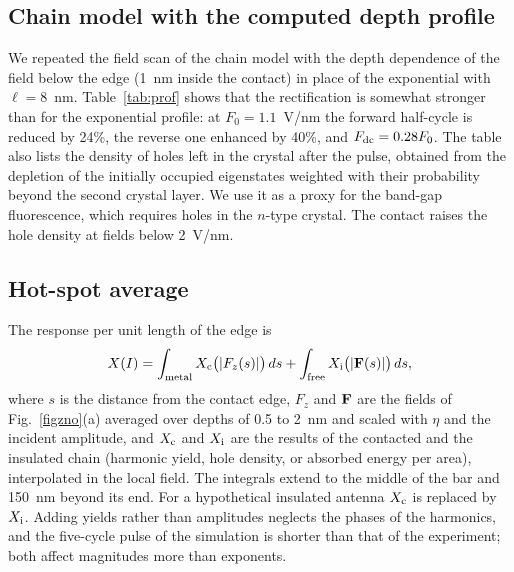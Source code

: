 \subsection{Chain model with the computed depth profile}
We repeated the field scan of the chain model with the depth dependence of the field below the edge
(1~nm inside the contact) in place of the exponential with $\ell=8$~nm. Table~\ref{tab:prof} shows
that the rectification is somewhat stronger than for the exponential profile: at $F_0=1.1$~V/nm the
forward half-cycle is reduced by 24\%, the reverse one enhanced by 40\%, and
$F_{\rm dc}=0.28F_0$. The table also lists the density of holes left in the crystal after the
pulse, obtained from the depletion of the initially occupied eigenstates weighted with their
probability beyond the second crystal layer. We use it as a proxy for the band-gap fluorescence,
which requires holes in the $n$-type crystal. The contact raises the hole density at fields below 2~V/nm.

\begin{table}[h]
\caption{Chain model with the depth profile of the near field below the edge of the bar. Other
parameters as in Table~\ref{tab:field}.}
\label{tab:prof}

\end{table}

\subsection{Hot-spot average}
The response per unit length of the edge is
\begin{equation}
X(I)=\int_{\rm metal}X_{\rm c}\big(|F_z(s)|\big)\,ds+\int_{\rm free}X_{\rm i}\big(|{\bf F}(s)|\big)\,ds ,
\end{equation}
where $s$ is the distance from the contact edge, $F_z$ and ${\bf F}$ are the fields of
Fig.~\ref{figzno}(a) averaged over depths of 0.5 to 2~nm and scaled with $\eta$ and the incident
amplitude, and $X_{\rm c}$ and $X_{\rm i}$ are the results of the contacted and the insulated chain
(harmonic yield, hole density, or absorbed energy per area), interpolated in the local field. The
integrals extend to the middle of the bar and 150~nm beyond its end. For a hypothetical insulated
antenna $X_{\rm c}$ is replaced by $X_{\rm i}$. Adding yields rather than amplitudes neglects the
phases of the harmonics, and the five-cycle pulse of the simulation is shorter than that of the
experiment; both affect magnitudes more than exponents.

